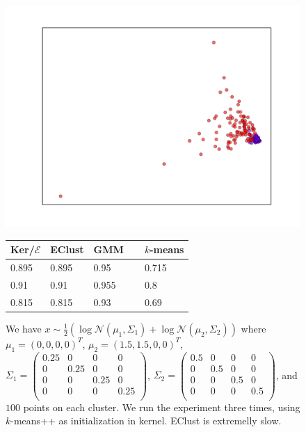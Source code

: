 \documentclass[aps,preprint,nofootinbib,floatfix]{revtex4-1}
\begin{document}
\begin{figure}[h]
\begin{minipage}{.49\textwidth}
\includegraphics[scale=.45]{loggauss2.pdf}
\end{minipage}
\begin{minipage}{.49\textwidth}
\begin{tabular}{ l l l l}
\hline
Ker/$\mathcal{E}$ & EClust & GMM~~ & $k$-means \\
\hline
0.895 &
0.895 &
0.95 &
0.715 \\
0.91 &
0.91 &
0.955 &
0.8 \\
0.815 &
0.815 &
0.93 &
0.69 \\
\hline
\end{tabular}
\end{minipage}
\caption{\label{fig:1dloggaus1}
We have $x \sim \tfrac{1}{2}\left( \log \mathcal{N}(\mu_1, \Sigma_1) +
\log \mathcal{N}(\mu_2, \Sigma_2)\right)$ where $\mu_1 = (0,0,0,0)^T$, 
$\mu_2=(1.5, 1.5,0,0)^T$,
$\Sigma_1 = 
\left( \begin{smallmatrix} 
0.25 & 0 & 0 & 0 \\ 
0 & 0.25 & 0 & 0 \\ 
0 & 0 & 0.25 & 0 \\ 
0 & 0 & 0 & 0.25 \\ 
\end{smallmatrix} \right)$, 
$\Sigma_2 = 
\left( \begin{smallmatrix} 
0.5 & 0 & 0 & 0 \\ 
0 & 0.5 & 0 & 0 \\ 
0 & 0 & 0.5 & 0 \\ 
0 & 0 & 0 & 0.5 \\ 
\end{smallmatrix} \right)$, 
and $100$ points on each cluster. We run the experiment three times,
using $k$-means++ as initialization in kernel. EClust is extremelly slow.
}
\end{figure}
\end{document}
